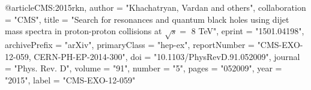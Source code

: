 @article{CMS:2015rkn,
    author = "Khachatryan, Vardan and others",
    collaboration = "CMS",
    title = "{Search for resonances and quantum black holes using dijet mass spectra in proton-proton collisions at $\sqrt{s} =$ 8 TeV}",
    eprint = "1501.04198",
    archivePrefix = "arXiv",
    primaryClass = "hep-ex",
    reportNumber = "CMS-EXO-12-059, CERN-PH-EP-2014-300",
    doi = "10.1103/PhysRevD.91.052009",
    journal = "Phys. Rev. D",
    volume = "91",
    number = "5",
    pages = "052009",
    year = "2015",
    label = "CMS-EXO-12-059"
}

